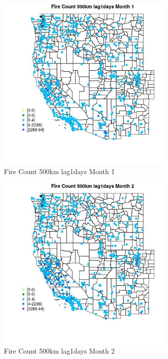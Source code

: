 \begin{figure} 
\centering  
\includegraphics[width=0.77\textwidth]{Code_Outputs/Report_ML_input_PM25_Step4_part_e_de_duplicated_aves_compiled_2019-05-21wNAs_MapObsMo1Fire_Count_500km_lag1days.jpg} 
\caption{\label{fig:Report_ML_input_PM25_Step4_part_e_de_duplicated_aves_compiled_2019-05-21wNAsMapObsMo1Fire_Count_500km_lag1days}Fire Count 500km lag1days Month 1} 
\end{figure} 
 

\begin{figure} 
\centering  
\includegraphics[width=0.77\textwidth]{Code_Outputs/Report_ML_input_PM25_Step4_part_e_de_duplicated_aves_compiled_2019-05-21wNAs_MapObsMo2Fire_Count_500km_lag1days.jpg} 
\caption{\label{fig:Report_ML_input_PM25_Step4_part_e_de_duplicated_aves_compiled_2019-05-21wNAsMapObsMo2Fire_Count_500km_lag1days}Fire Count 500km lag1days Month 2} 
\end{figure} 
 

